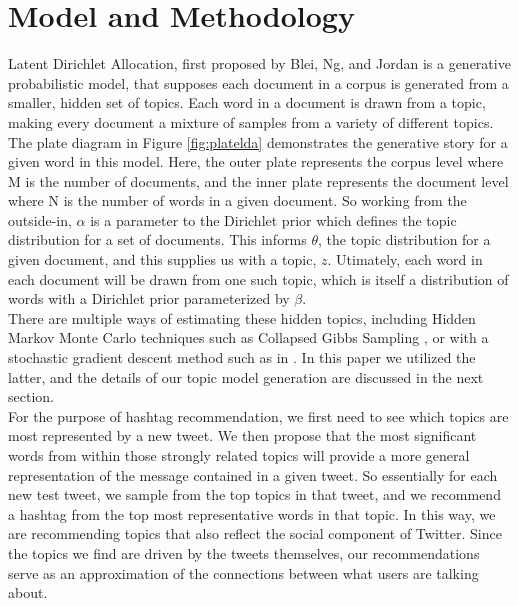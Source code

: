 \documentclass{acm_proc_article-sp}
\begin{document}
\section{Model and Methodology}
\hspace*{5mm}Latent Dirichlet Allocation, first proposed by Blei, Ng, and Jordan \cite{blei2003latent} is a generative probabilistic model, that supposes each document in a corpus is generated from a smaller, hidden set of topics. Each word in a document is drawn from a topic, making every document a mixture of samples from a variety of different topics. The plate diagram in Figure \ref{fig:platelda} demonstrates the generative story for a given word in this model. Here, the outer plate represents the corpus level where M is the number of documents, and the inner plate represents the document level where N is the number of words in a given document. So working from the outside-in, $\alpha$ is a parameter to the Dirichlet prior which defines the topic distribution for a set of documents. This informs $\theta$, the topic distribution for a given document, and this supplies us with a topic, $z$. Utimately, each word in each document will be drawn from one such topic, which is itself a distribution of words with a Dirichlet prior parameterized by $\beta$.\\
\hspace*{5mm}There are multiple ways of estimating these hidden topics, including Hidden Markov Monte Carlo techniques such as Collapsed Gibbs Sampling \cite{griffiths2002gibbs}, or with a stochastic gradient descent method such as in \cite{hoffman2010online}. In this paper we utilized the latter, and the details of our topic model generation are discussed in the next section.\\
\hspace*{5mm}For the purpose of hashtag recommendation, we first need to see which topics are most represented by a new tweet. We then propose that the most significant words from within those  strongly related topics will provide a more general representation of the message contained in a given tweet. So essentially for each new test tweet, we sample from the top topics in that tweet, and we recommend a hashtag from the top most representative words in that topic. In this way, we are recommending topics that also reflect the social component of Twitter. Since the topics we find are driven by the tweets themselves, our recommendations serve as an approximation of the connections between what users are talking about.\\
\end{document}
